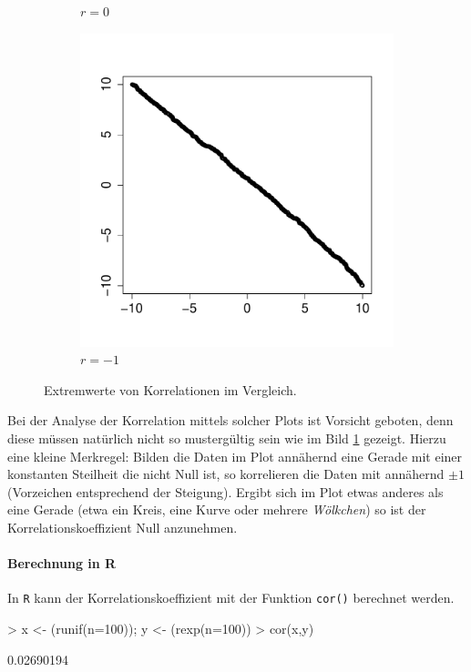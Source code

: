 \begin{figure}[h!]
\begin{subfigure}[b]{0.3\textwidth}
\caption{$r=0$}
\end{subfigure}
\begin{subfigure}[b]{0.3\textwidth}
\includegraphics{begriffe-017}
\caption{$r=-1$}
\end{subfigure}
\caption{Extremwerte von Korrelationen im Vergleich.}
\label{fig:korrelation}
\end{figure}

\noindent
Bei der Analyse der Korrelation mittels solcher Plots ist Vorsicht
geboten, denn diese müssen natürlich nicht so mustergültig sein wie im 
Bild \ref{fig:korrelation} gezeigt. 
Hierzu eine kleine Merkregel: Bilden die
Daten im Plot annähernd eine Gerade mit
einer konstanten Steilheit die nicht Null ist, so korrelieren die Daten
mit annähernd $\pm1$ (Vorzeichen entsprechend der Steigung).
Ergibt sich im Plot etwas anderes als eine Gerade (etwa ein Kreis, eine
Kurve oder mehrere \emph{Wölkchen}) so ist der Korrelationskoeffizient
Null anzunehmen.

\paragraph{Berechnung in R}
In \lstinline{R} kann der Korrelationskoeffizient mit der Funktion
\lstinline{cor()} berechnet werden.

\begin{Schunk}
\begin{Sinput}
> x <- (runif(n=100)); y <- (rexp(n=100))
> cor(x,y)
\end{Sinput}
\begin{Soutput}
[1] 0.02690194
\end{Soutput}
\end{Schunk}
